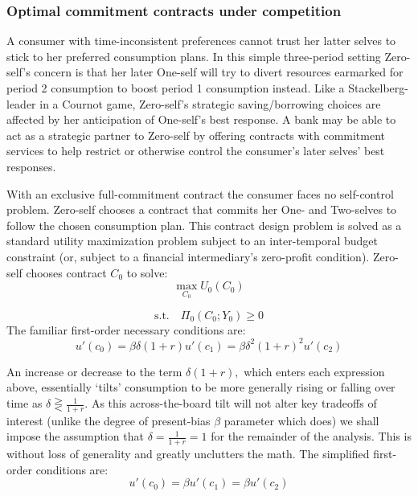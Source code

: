 \documentclass[11pt,english]{article}
\theoremstyle{plain}
\theoremstyle{definition}
\begin{document}
\subsubsection{Optimal commitment contracts under competition}

\label{sec-FCC} A consumer with time-inconsistent preferences cannot
trust her latter selves to stick to her preferred consumption plans.
In this simple three-period setting Zero-self's concern is that her
later One-self will try to divert resources earmarked for period 2
consumption to boost period 1 consumption instead. Like a Stackelberg-leader
in a Cournot game, Zero-self's strategic saving/borrowing choices
are affected by her anticipation of One-self's best response. A bank
may be able to act as a strategic partner to Zero-self by offering
contracts with commitment services to help restrict or otherwise control
the consumer's later selves' best responses.

With an exclusive full-commitment contract the consumer faces no self-control
problem. Zero-self chooses a contract that commits her One- and Two-selves
to follow the chosen consumption plan. This contract design problem
is solved as a standard utility maximization problem subject to an
inter-temporal budget constraint (or, subject to a financial intermediary's
zero-profit condition). Zero-self chooses contract $C_{0}$ to solve:
\begin{equation}
\max_{C_{0}}U_{0}(C_{0})\label{eq:cobj0}
\end{equation}

\begin{equation}
\text{s.t.}\quad\Pi_{0}(C_{0};Y_{0})\geq0\label{eq:BPC0}
\end{equation}
The familiar first-order necessary conditions are: 
\begin{equation}
u'\left(c_{0}\right)=\beta\delta(1+r)u'\left(c_{1}\right)=\beta\delta^{2}(1+r)^{2}u'\left(c_{2}\right)
\end{equation}

An increase or decrease to the term $\delta(1+r),$ which enters each
expression above, essentially `tilts' consumption to be more generally
rising or falling over time as $\delta\gtreqless\frac{1}{1+r}$. As
this across-the-board tilt will not alter key tradeoffs of
interest (unlike the degree of present-bias $\beta$ parameter which
does) we shall impose the assumption that $\delta=\frac{1}{1+r}=1$
for the remainder of the analysis. This is without loss of generality
and greatly unclutters the math. The simplified first-order conditions
are: 
\begin{equation}
u'\left(c_{0}\right)=\beta u'\left(c_{1}\right)=\beta u'\left(c_{2}\right)\label{eq:FOC_comp}
\end{equation}
\end{document}

